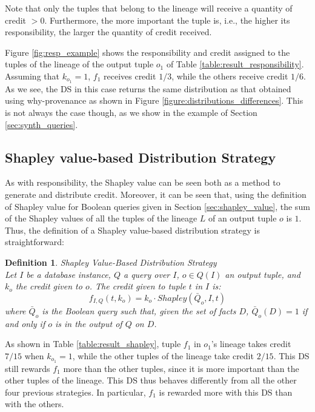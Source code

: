\documentclass[preprint,12pt,sort&compress]{elsarticle}
\newcommand{\rtwo}[1]{\textcolor{reviewer2}{#1}}
\newtheorem{definition}{Definition}[section]
\begin{document}
Note that only the tuples that belong to the lineage will receive a quantity of credit $> 0$. Furthermore, the more important the tuple is, i.e., the higher its responsibility, the larger the quantity of credit received. 

Figure \ref{fig:resp_example} shows the responsibility and credit assigned to the tuples of the lineage of the output tuple $o_1$ of Table \ref{table:result_responsibility}. 
Assuming that $k_{o_1} = 1$, $f_1$ receives credit $1/3$, while the others receive credit $1/6$. 
As we see, the DS in this case returns the same distribution as that obtained using why-provenance as shown in Figure \ref{figure:distributions_differences}.
This is not always the case though, as we show in the example of Section \ref{sec:synth_queries}.

\rtwo{\subsection{Shapley value-based Distribution Strategy}}

As with responsibility, the Shapley value can be seen both as a method to generate and distribute credit. Moreover, it can be seen that, using the definition of Shapley value for Boolean queries given in Section \ref{sec:shapley_value}, the sum of the Shapley values of all the tuples of the lineage $L$ of an output tuple $o$ is $1$. Thus, the definition of a Shapley value-based distribution strategy is straightforward:

\begin{definition}{Shapley Value-Based Distribution Strategy} \\
	Let $I$ be a database instance, $Q$ a query over $I$, $o \in Q(I)$ an output tuple, and $k_o$ the credit given to $o$. The credit given to tuple $t$ in $I$ is:
	\[
		f_{I, Q}(t, k_o) = k_o \cdot 
		Shapley(\bar{Q}_o, I, t)
	\] 
	where $\bar{Q}_o$ is the Boolean query such that, given the set of facts $D$, $\bar{Q}_o(D) = 1$ if and only if $o$ is in the output of $Q$ on $D$.
\end{definition}

As shown in Table \ref{table:result_shapley}, tuple $f_1$ in $o_1$'s lineage takes credit $7/15$ when $k_{o_1} = 1$, while the other tuples of the lineage take credit $2/15$. This DS still rewards $f_1$ more than the other tuples, since it is more important than the other tuples of the lineage. This DS thus behaves differently from all the other four previous strategies. In particular, $f_1$ is rewarded more with this DS than with the others.
\end{document}
